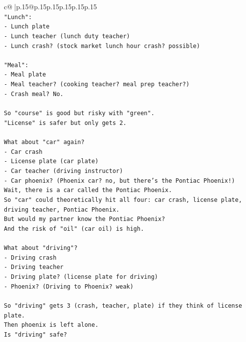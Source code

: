 \documentclass{article}
\begin{document}
{\begin{supertabular}{c@{$\;$}|p{.15\linewidth}@{}p{.15\linewidth}p{.15\linewidth}p{.15\linewidth}p{.15\linewidth}p{.15\linewidth}}
{{{\\ 
\texttt{"Lunch":} \\
\texttt{{-} Lunch plate} \\
\texttt{{-} Lunch teacher (lunch duty teacher)} \\
\texttt{{-} Lunch crash? (stock market lunch hour crash? possible)} \\
\\ 
\texttt{"Meal":} \\
\texttt{{-} Meal plate} \\
\texttt{{-} Meal teacher? (cooking teacher? meal prep teacher?)} \\
\texttt{{-} Crash meal? No.} \\
\\ 
\texttt{So "course" is good but risky with "green".} \\
\texttt{"License" is safer but only gets 2.} \\
\\ 
\texttt{What about "car" again?} \\
\texttt{{-} Car crash} \\
\texttt{{-} License plate (car plate)} \\
\texttt{{-} Car teacher (driving instructor)} \\
\texttt{{-} Car phoenix? (Phoenix car? no, but there's the Pontiac Phoenix!)} \\
\texttt{Wait, there is a car called the Pontiac Phoenix.} \\
\texttt{So "car" could theoretically hit all four: car crash, license plate, driving teacher, Pontiac Phoenix.} \\
\texttt{But would my partner know the Pontiac Phoenix?} \\
\texttt{And the risk of "oil" (car oil) is high.} \\
\\ 
\texttt{What about "driving"?} \\
\texttt{{-} Driving crash} \\
\texttt{{-} Driving teacher} \\
\texttt{{-} Driving plate? (license plate for driving)} \\
\texttt{{-} Phoenix? (Driving to Phoenix? weak)} \\
\\ 
\texttt{So "driving" gets 3 (crash, teacher, plate) if they think of license plate.} \\
\texttt{Then phoenix is left alone.} \\
\texttt{Is "driving" safe?} \\
}}}
\end{supertabular}}
\end{document}
